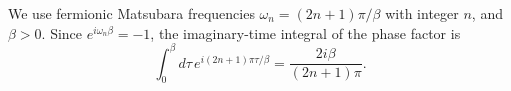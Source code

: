 \documentclass{article}
\begin{document}
We use fermionic Matsubara frequencies $\omega_n = (2n+1)\pi/\beta$ with integer $n$, and $\beta>0$.
Since $e^{i\omega_n\beta}=-1$, the imaginary-time integral of the phase factor is
\begin{equation}
\int_0^{\beta} d\tau\, e^{i(2n+1)\pi\tau/\beta} = \frac{2i\beta}{(2n+1)\pi} .
\label{eq:mats}
\end{equation}
\end{document}
